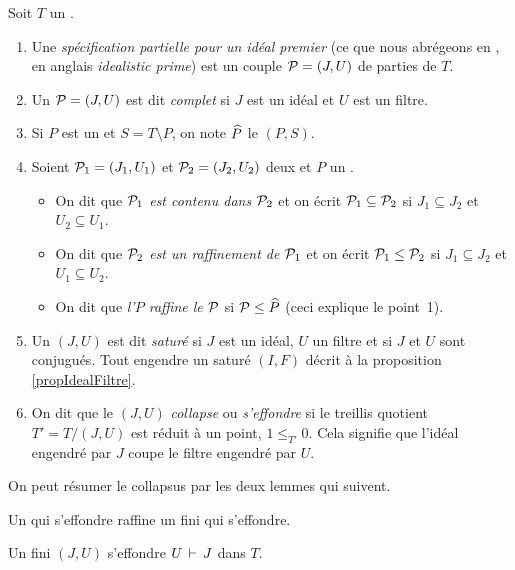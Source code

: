 \begin{definition}{\rm 
\label{defProiT} Soit $T$ un \trdi.
\begin{enumerate}
\item 
Une {\em spécification partielle pour un idéal premier} (ce que nous 
abrégeons en {\em \proi}, en anglais {\em idealistic prime}) est un 
couple ${\cal P}=(J,U)$ de parties de $T$. 
%
\item Un \proi ${\cal P}=(J,U)$ est dit {\em complet} si $J$ est un  idéal et  
$U$ est un filtre. %
%
\item Si $P$ est  un \idep et $S=T\setminus P$, on note $\widehat{P}$ le \proi $(P,S)$.
%
\item Soient ${\cal P}_1=(J_1,U_1)$ et ${\cal P}_2=(J_2,U_2)$  deux \prois et $P$ un \idep.
\begin{itemize}
%
\item On  dit que {\em ${\cal P}_1$ est contenu dans ${\cal P}_2$} et on écrit 
${\cal P}_1\subseteq {\cal P}_2$ si $J_1\subseteq J_2$ et  $U_2\subseteq U_1$.
%
\item  On  dit que  \emph{${\cal P}_2$ est un raffinement de ${\cal P}_1$} et on 
écrit 
${\cal P}_1\leq {\cal P}_2$ si $J_1\subseteq J_2$ et  $U_1\subseteq U_2$.
%
\item  On  dit que  \emph{l'\idep $P$ raffine le \proi ${\cal P}$} si ${\cal P}\leq \widehat{P}$
(ceci explique le point~1). 
%
\end{itemize}
\item  Un \proi $(J,U)$  est dit {\em saturé} si $J$  est un idéal, 
$U$ un filtre et si $J$  et $U$  sont conjugués. Tout \proi engendre un 
\proi saturé $(I,F)$ décrit à la proposition \ref{propIdealFiltre}.
%
\item  On dit que le \proi $(J,U)$ {\em collapse} ou
{\em s'effondre} si  le treillis quotient $T'=T/(J,U)$ est réduit à un
point, \cad  $1 \leq_{T'}0$. Cela signifie que l'idéal engendré par $J$ coupe le filtre engendré par $U$. 
%
\end{enumerate}
}
\end{definition}

On peut résumer le collapsus par les deux lemmes qui suivent.
 
\begin{lemma} \label{lemfinicol3}
Un \proi qui s'effondre raffine un \proi fini qui s'effondre. 
\end{lemma}
\begin{lemma} \label{lemfinicol4}
Un \proi fini  $(J,U)$   s'effondre  \ssi $U\,\vdash\, J$
dans  $T$. 
\end{lemma}

